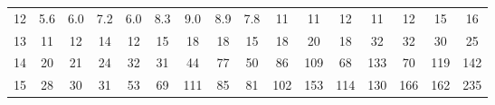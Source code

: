 \begin{table}[!htbp]
{\begin{tabular}{c|ccccccccccccccc}
        \rowcolor[HTML]{FFFFFF} 
        12                         & 5.6                                              & 6.0                         & 7.2                         & 6.0                         & 8.3                         & 9.0                                              & 8.9                        & 7.8                         & \cellcolor[HTML]{8DB4E2}11  & \cellcolor[HTML]{8DB4E2}11  & \cellcolor[HTML]{8DB4E2}12  & \cellcolor[HTML]{8DB4E2}11  & \cellcolor[HTML]{8DB4E2}12  & \cellcolor[HTML]{8DB4E2}15  & \cellcolor[HTML]{8DB4E2}16  \\
        \rowcolor[HTML]{8DB4E2} 
        \cellcolor[HTML]{FFFFFF}13 & 11                                               & 12                          & 14                          & 12                          & 15                          & 18                                               & 18                         & 15                          & 18                          & 20                          & 18                          & 32                          & 32                          & 30                          & 25                          \\
        \rowcolor[HTML]{8DB4E2} 
        \cellcolor[HTML]{FFFFFF}14 & 20                                               & 21                          & 24                          & 32                          & 31                          & 44                                               & 77                         & 50                          & 86                          & \cellcolor[HTML]{538DD5}109 & 68                          & \cellcolor[HTML]{538DD5}133 & 70                          & \cellcolor[HTML]{538DD5}119 & \cellcolor[HTML]{538DD5}142 \\
        \rowcolor[HTML]{538DD5} 
        \cellcolor[HTML]{FFFFFF}15 & \cellcolor[HTML]{8DB4E2}28                       & \cellcolor[HTML]{8DB4E2}30  & \cellcolor[HTML]{8DB4E2}31  & \cellcolor[HTML]{8DB4E2}53  & \cellcolor[HTML]{8DB4E2}69  & 111                                              & \cellcolor[HTML]{8DB4E2}85 & \cellcolor[HTML]{8DB4E2}81  & 102                         & 153                         & 114                         & 130                         & 166                         & 162                         & 235                        
                         
        \end{tabular}
    }
\end{table}


